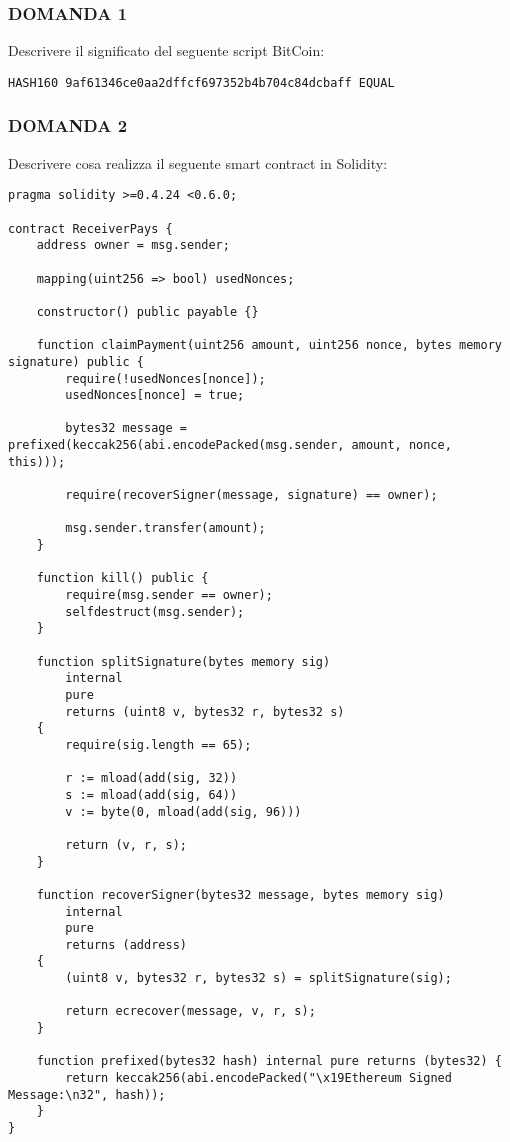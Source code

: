 \subsubsection{DOMANDA 1}
Descrivere il significato del seguente script BitCoin:

\begin{center}
    \texttt{HASH160 9af61346ce0aa2dffcf697352b4b704c84dcbaff EQUAL}
\end{center}

\subsubsection{DOMANDA 2}
Descrivere cosa realizza il seguente smart contract in Solidity:
\begin{lstlisting}[language=Solidity]
pragma solidity >=0.4.24 <0.6.0;

contract ReceiverPays {
    address owner = msg.sender;

    mapping(uint256 => bool) usedNonces;

    constructor() public payable {}

    function claimPayment(uint256 amount, uint256 nonce, bytes memory signature) public {
        require(!usedNonces[nonce]);
        usedNonces[nonce] = true;

        bytes32 message = prefixed(keccak256(abi.encodePacked(msg.sender, amount, nonce, this)));

        require(recoverSigner(message, signature) == owner);

        msg.sender.transfer(amount);
    }

    function kill() public {
        require(msg.sender == owner);
        selfdestruct(msg.sender);
    }

    function splitSignature(bytes memory sig)
        internal
        pure
        returns (uint8 v, bytes32 r, bytes32 s)
    {
        require(sig.length == 65);

        r := mload(add(sig, 32))
        s := mload(add(sig, 64))
        v := byte(0, mload(add(sig, 96)))
        
        return (v, r, s);
    }

    function recoverSigner(bytes32 message, bytes memory sig)
        internal
        pure
        returns (address)
    {
        (uint8 v, bytes32 r, bytes32 s) = splitSignature(sig);

        return ecrecover(message, v, r, s);
    }

    function prefixed(bytes32 hash) internal pure returns (bytes32) {
        return keccak256(abi.encodePacked("\x19Ethereum Signed Message:\n32", hash));
    }
}

\end{lstlisting}

